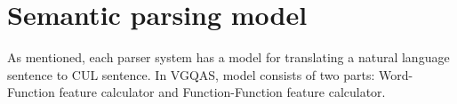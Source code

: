 \section{Semantic parsing model}
\label{sec:model}
As mentioned, each parser system has a model for translating a natural language sentence to CUL sentence. In VGQAS, model consists of two parts: Word-Function feature calculator and Function-Function feature calculator.



